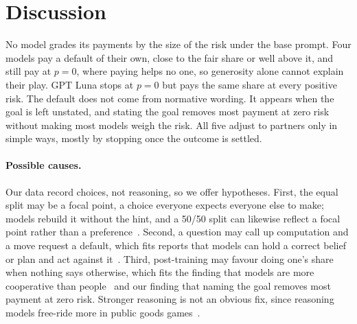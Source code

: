 \section{Discussion}
\label{sec:discussion}

No model grades its payments by the size of the risk under the base prompt. Four models pay
a default of their own, close to the fair share or well above it, and still pay at $p=0$,
where paying helps no one, so generosity alone cannot explain their play. GPT Luna stops at
$p=0$ but pays the same share at every positive risk. The default does not come from
normative wording. It appears when the goal is left unstated, and stating the goal removes
most payment at zero risk without making most models weigh the risk. All five adjust to
partners only in simple ways, mostly by stopping once the outcome is settled.

\paragraph{Possible causes.}
Our data record choices, not reasoning, so we offer hypotheses. First, the equal split may be
a focal point, a choice everyone expects everyone else to make; models rebuild it without the
hint, and a 50/50 split can likewise reflect a focal point rather than a
preference~\cite{dodivers2025uncovering}. Second, a question may call up computation and a
move request a default, which fits reports that models can hold a correct belief or plan and
act against it~\cite{fan2024can,schmied2026llms}. Third, post-training may favour doing one's
share when nothing says otherwise, which fits the finding that models are more cooperative
than people~\cite{mei2024turing} and our finding that naming the goal removes most payment at
zero risk. Stronger reasoning is not an obvious fix, since reasoning models free-ride more in
public goods games~\cite{guzmanpiedrahita2025corrupted}.

